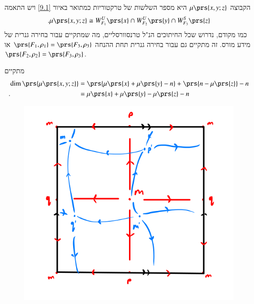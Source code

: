\documentclass[a4paper,10pt,twoside,openany]{book}
\begin{document}
\begin{remark}
הקבוצה
$\mu\prs{x,y;z}$
היא מספר השלשות של טרקטוריות כמתואר באיור
\ref{9.1}
ויש התאמה
\[\text{.} \mu\prs{x,y;z} \cong W_{F_1}^U\prs{x} \cap W_{F_2}^U\prs{y} \cap W_{F_3}^S\prs{z}\]
כמו מקודם, נדרוש שכל החיתוכים הנ"ל טרנסוורסליים, מה שמתקיים עבור בחירה גנרית של מידע מורס.
זה מתקיים גם עבור בחירה גנרית תחת ההנחה
$\prs{F_1, \rho_1} = \prs{F_3, \rho_3}$
או
$\prs{F_2, \rho_2} = \prs{F_3, \rho_3}$.
\end{remark}

\begin{remark}
מתקיים
\begin{align*}
\dim\prs{\mu\prs{x,y;z}} &= \prs{\mu\prs{x} + \mu\prs{y} - n} + \prs{n - \mu\prs{z}} - n
\\ \text{.} \hphantom{\dim\prs{\mu\prs{x,y;z}}} &= \mu\prs{x} + \mu\prs{y} - \mu\prs{z} - n
\end{align*}
\end{remark}

\begin{figure}
\centering
\includegraphics[scale=0.5]{sources/9.2}
\caption{}
\label{9.2}
\end{figure}
\end{document}
